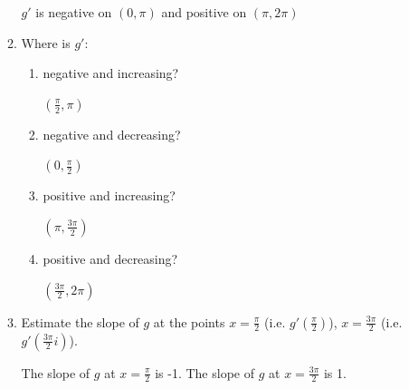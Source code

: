 \documentclass[nooutcomes,handout]{ximera}
\begin{document}
\begin{problem}
\begin{enumerate}
\begin{enumerate}
		\begin{freeResponse}
			$g'$ is negative on $(0,\pi)$ and positive on $(\pi,2\pi)$
		\end{freeResponse}
			\item Where is $g'$:
			\begin{enumerate}
			\item negative and increasing?
				\begin{freeResponse}
					$(\frac{\pi}{2},\pi)$
				\end{freeResponse}
			\item negative and decreasing?
				\begin{freeResponse}
					$(0,\frac{\pi}{2})$
				\end{freeResponse}
			\item positive and increasing?
				\begin{freeResponse}
					$(\pi,\frac{3\pi}{2})$
				\end{freeResponse}
			\item positive and decreasing?
				\begin{freeResponse}
					$(\frac{3\pi}{2},2\pi)$
				\end{freeResponse}
			\end{enumerate}
			\item Estimate the slope of $g$ at the points $x=\frac{\pi}{2}$ (i.e. $g'(\frac{\pi}{2})$), $x=\frac{3\pi}{2}$ (i.e. $g'(\frac{3\pi}{2}i)$).
				\begin{freeResponse}
					The slope of $g$ at  $x=\frac{\pi}{2}$  is -1.  The slope of $g$ at $x=\frac{3\pi}{2}$ is 1.
				\end{freeResponse}
		\end{enumerate}			


\end{enumerate}
\end{problem}
\end{document}
